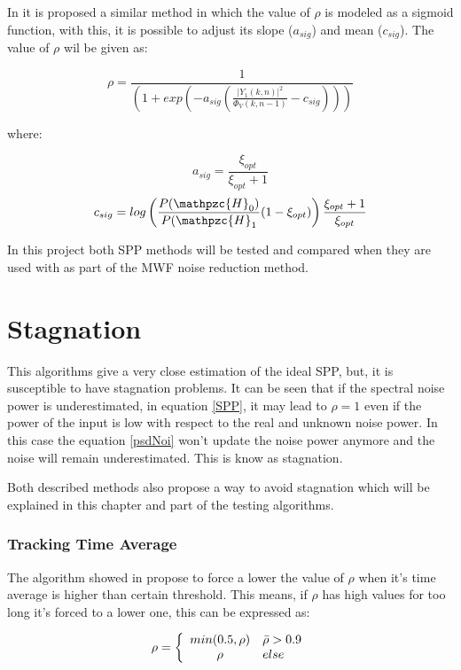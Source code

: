 In \cite{PeiCheeYongSvenNordholm2012NoiseSmoothong} it is proposed a similar method in which the value of $\rho$ is modeled as a sigmoid function, with this, it is possible to adjust its slope ($a_{sig}$)  and mean ($c_{sig}$). The value of $\rho$ wil be given as:

\begin{equation}\label{SPPyong}
{\rho=\frac{1}{\left( 1+exp\left(-a_{sig}\left(\frac{|Y_1(k,n)|^2}{\Phi_{V}(k,n-1)}-c_{sig}\right)\right)\right)}}
\end{equation}


where:

$$a_{sig}=\frac{\xi_{opt}}{\xi_{opt}+1}$$
$$c_{sig}=log\left(\frac{P(\mathpzc{H}_0)}{P(\mathpzc{H}_1}(1-\xi_{opt}) \right)\frac{\xi_{opt}+1}{\xi_{opt}}$$

In this project both SPP methods will be tested and compared when they are used with as part of the MWF noise reduction method.

\section{Stagnation}

This algorithms give a very close estimation of the ideal SPP, but, it is susceptible to have stagnation problems. It can be seen that if the spectral noise power is underestimated, in equation \eqref{SPP}, it may lead to $\rho=1$ even if the power of the input is low with respect to the real and unknown noise power. In this case the equation \eqref{psdNoi} won't update the noise power anymore and the noise will remain underestimated. This is know as stagnation.

Both described  methods also propose a way to avoid stagnation which will be explained in this chapter and part of the testing algorithms.

\subsubsection{Tracking Time Average}

The algorithm showed in \cite{Gerkmann2011NoisePresence} propose to force a lower the value of $\rho$ when it's time average is higher than certain threshold. This means, if $\rho$ has high values for too long it's forced to a lower one, this can be expressed as:


\begin{equation}\label{Stag1}
\rho = \left\{
\begin{array}{c l}
 min(0.5 , \rho) &  \bar{\rho}>0.9\\
 \rho & else
\end{array}
\right.
\end{equation}

